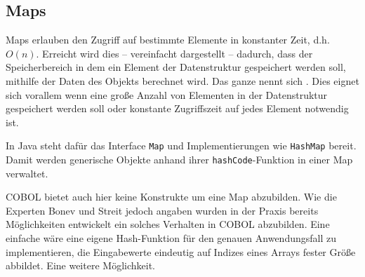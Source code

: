 \subsection{Maps}
Maps erlauben den Zugriff auf bestimmte Elemente in konstanter Zeit, d.h. $O(n)$. Erreicht wird dies -- vereinfacht dargestellt -- dadurch, dass der Speicherbereich in dem ein Element der Datenstruktur gespeichert werden soll, mithilfe der Daten des Objekts berechnet wird. Das ganze nennt sich . Dies eignet sich vorallem wenn eine große Anzahl von Elementen in der Datenstruktur gespeichert werden soll oder konstante Zugriffszeit auf jedes Element notwendig ist.

In Java steht dafür das Interface \texttt{Map} und Implementierungen wie \texttt{HashMap} bereit. Damit werden generische Objekte anhand ihrer \texttt{hashCode}-Funktion in einer Map verwaltet.

COBOL bietet auch hier keine Konstrukte um eine Map abzubilden. Wie die Experten Bonev und Streit jedoch angaben wurden in der Praxis bereits Möglichkeiten entwickelt ein solches Verhalten in COBOL abzubilden. Eine einfache wäre eine eigene Hash-Funktion für den genauen Anwendungsfall zu implementieren, die Eingabewerte eindeutig auf Indizes eines Arrays fester Größe abbildet. Eine weitere Möglichkeit.